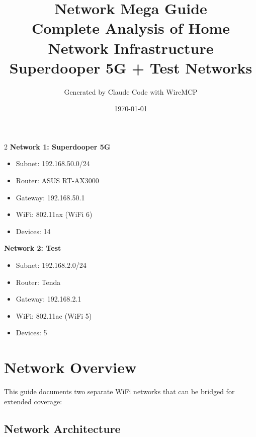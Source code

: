 \documentclass[11pt,letterpaper]{article}
\title{\textbf{Network Mega Guide}\\[0.5em]\large Complete Analysis of Home Network Infrastructure\\[0.3em]\normalsize Superdooper 5G + Test Networks}
\author{Generated by Claude Code with WireMCP}
\date{\today}
\begin{document}
\maketitle

\begin{tcolorbox}[colback=blue!5,colframe=blue!50!black,title=Quick Reference]
\begin{multicols}{2}
\textbf{Network 1: Superdooper 5G}
\begin{itemize}[noitemsep]
    \item Subnet: 192.168.50.0/24
    \item Router: ASUS RT-AX3000
    \item Gateway: 192.168.50.1
    \item WiFi: 802.11ax (WiFi 6)
    \item Devices: 14
\end{itemize}
\columnbreak
\textbf{Network 2: Test}
\begin{itemize}[noitemsep]
    \item Subnet: 192.168.2.0/24
    \item Router: Tenda
    \item Gateway: 192.168.2.1
    \item WiFi: 802.11ac (WiFi 5)
    \item Devices: 5
\end{itemize}
\end{multicols}
\end{tcolorbox}

\tableofcontents
\newpage

\section{Network Overview}

This guide documents two separate WiFi networks that can be bridged for extended coverage:

\subsection{Network Architecture}
\end{document}
